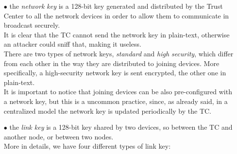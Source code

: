 \documentclass[12pt]{report}
\begin{document}
\begin{itemize}
\setlength{\itemindent}{+4mm}
\item[$\bullet$] the \emph{network key} is a 128-bit key generated and distributed by the Trust Center to all the network devices in order to allow them to communicate in broadcast securely.\\
It is clear that the TC cannot send the network key in plain-text, otherwise an attacker could sniff that, making it useless.\\
There are two types of network keys, \emph{standard} and \emph{high security}, which differ from each other in the way they are distributed to joining devices. More specifically, a high-security network key is sent encrypted, the other one in plain-text.\\
It is important to notice that joining devices can be also pre-configured with a network key, but this is a uncommon practice, since, as already said,  in a centralized model the network key is updated periodically by the TC.
\item[$\bullet$] the \emph{link key} is a 128-bit key shared by two devices, so between the TC and another node, or between two nodes.\\
More in details, we have four different types of link key:


\end{itemize}
\end{document}
